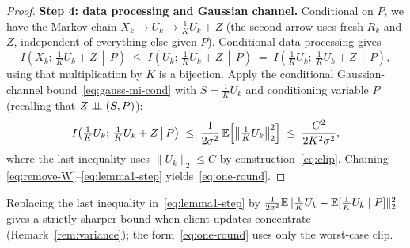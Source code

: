 \begin{proof}
\textbf{Step 4: data processing and Gaussian channel.}
Conditional on \(P\), we have the Markov chain \(X_k\to U_k\to \tfrac{1}{K}U_k+Z\) (the second arrow uses fresh \(R_k\) and \(Z\), independent of everything else given \(P\)). Conditional data processing gives
\begin{equation}\label{eq:dpi}
I\!\left(X_k;\,\tfrac{1}{K}U_k+Z\,\middle|\,P\right)\;\le\;I\!\left(U_k;\,\tfrac{1}{K}U_k+Z\,\middle|\,P\right)\;=\;I\!\left(\tfrac{1}{K}U_k;\,\tfrac{1}{K}U_k+Z\,\middle|\,P\right),
\end{equation}
using that multiplication by \(K\) is a bijection. Apply the conditional Gaussian-channel bound~\eqref{eq:gauss-mi-cond} with \(S=\tfrac{1}{K}U_k\) and conditioning variable \(P\) (recalling that \(Z\perp\!\!\!\perp(S,P)\)):
\begin{equation}\label{eq:lemma1-step}
I\!\left(\tfrac{1}{K}U_k;\,\tfrac{1}{K}U_k+Z\,\middle|\,P\right)\;\le\;\frac{1}{2\sigma^2}\,\mathbb{E}\!\left[\big\|\tfrac{1}{K}U_k\big\|_2^2\right]\;\le\;\frac{C^2}{2K^2\sigma^2},
\end{equation}
where the last inequality uses \(\|U_k\|_2\le C\) by construction~\eqref{eq:clip}. Chaining \eqref{eq:remove-W}--\eqref{eq:lemma1-step} yields~\eqref{eq:one-round}.
\end{proof}

\begin{remark}
Replacing the last inequality in~\eqref{eq:lemma1-step} by \(\tfrac{1}{2\sigma^2}\mathbb{E}\|\tfrac{1}{K}U_k-\mathbb{E}[\tfrac{1}{K}U_k\mid P]\|_2^2\) gives a strictly sharper bound when client updates concentrate (Remark~\ref{rem:variance}); the form~\eqref{eq:one-round} uses only the worst-case clip.
\end{remark}
